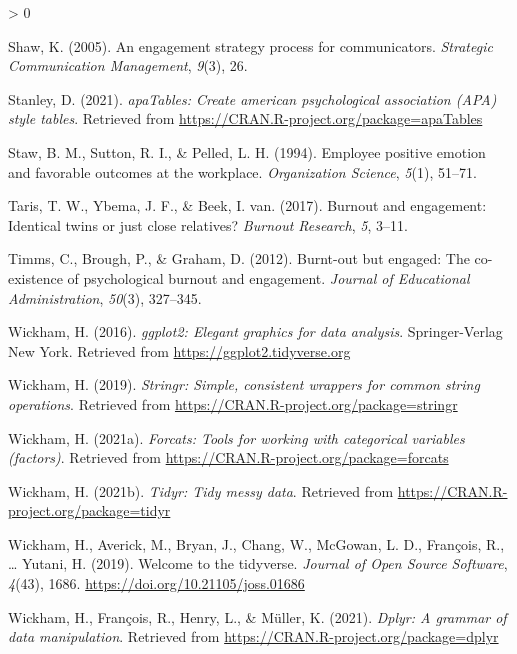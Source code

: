 \documentclass[
  english,
  man]{apa6}
\newlength{\cslhangindent}
\newenvironment{CSLReferences}[2] %
 {%
  \setlength{\parindent}{0pt}
  \ifodd #1 \everypar{\setlength{\hangindent}{\cslhangindent}}\ignorespaces\fi
  \ifnum #2 > 0
  \setlength{\parskip}{#2\baselineskip}
  \fi
 }%
 {}
\begin{document}
\begin{CSLReferences}{1}{0}
\leavevmode\hypertarget{ref-shaw2005engagement}{}%
Shaw, K. (2005). An engagement strategy process for communicators. \emph{Strategic Communication Management}, \emph{9}(3), 26.

\leavevmode\hypertarget{ref-R-apaTables}{}%
Stanley, D. (2021). \emph{apaTables: Create american psychological association (APA) style tables}. Retrieved from \url{https://CRAN.R-project.org/package=apaTables}

\leavevmode\hypertarget{ref-staw_employee_1994}{}%
Staw, B. M., Sutton, R. I., \& Pelled, L. H. (1994). Employee positive emotion and favorable outcomes at the workplace. \emph{Organization Science}, \emph{5}(1), 51--71.

\leavevmode\hypertarget{ref-taris2017burnout}{}%
Taris, T. W., Ybema, J. F., \& Beek, I. van. (2017). Burnout and engagement: Identical twins or just close relatives? \emph{Burnout Research}, \emph{5}, 3--11.

\leavevmode\hypertarget{ref-timms2012burnt}{}%
Timms, C., Brough, P., \& Graham, D. (2012). Burnt-out but engaged: The co-existence of psychological burnout and engagement. \emph{Journal of Educational Administration}, \emph{50}(3), 327--345.

\leavevmode\hypertarget{ref-R-ggplot2}{}%
Wickham, H. (2016). \emph{ggplot2: Elegant graphics for data analysis}. Springer-Verlag New York. Retrieved from \url{https://ggplot2.tidyverse.org}

\leavevmode\hypertarget{ref-R-stringr}{}%
Wickham, H. (2019). \emph{Stringr: Simple, consistent wrappers for common string operations}. Retrieved from \url{https://CRAN.R-project.org/package=stringr}

\leavevmode\hypertarget{ref-R-forcats}{}%
Wickham, H. (2021a). \emph{Forcats: Tools for working with categorical variables (factors)}. Retrieved from \url{https://CRAN.R-project.org/package=forcats}

\leavevmode\hypertarget{ref-R-tidyr}{}%
Wickham, H. (2021b). \emph{Tidyr: Tidy messy data}. Retrieved from \url{https://CRAN.R-project.org/package=tidyr}

\leavevmode\hypertarget{ref-R-tidyverse}{}%
Wickham, H., Averick, M., Bryan, J., Chang, W., McGowan, L. D., François, R., \ldots{} Yutani, H. (2019). Welcome to the {tidyverse}. \emph{Journal of Open Source Software}, \emph{4}(43), 1686. \url{https://doi.org/10.21105/joss.01686}

\leavevmode\hypertarget{ref-R-dplyr}{}%
Wickham, H., François, R., Henry, L., \& Müller, K. (2021). \emph{Dplyr: A grammar of data manipulation}. Retrieved from \url{https://CRAN.R-project.org/package=dplyr}


\end{CSLReferences}
\end{document}
